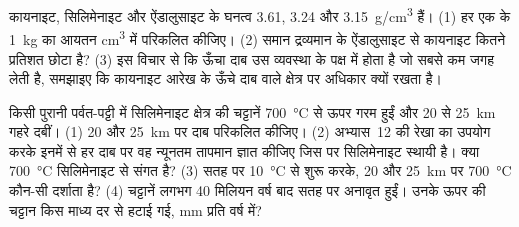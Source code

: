 \begin{exercise}[$\star\star\star$]\label{exo:g12:metamorphic-rocks:14}
कायनाइट, सिलिमेनाइट और ऐंडालुसाइट के घनत्व \num{3.61},
\num{3.24} और \qty{3.15}{g/cm^3} हैं। (1) हर एक के \qty{1}{kg} का
आयतन \unit{cm^3} में परिकलित कीजिए। (2) समान द्रव्यमान के ऐंडालुसाइट से कायनाइट
कितने प्रतिशत छोटा है? (3) इस विचार से कि ऊँचा दाब उस व्यवस्था के पक्ष में
होता है जो सबसे कम जगह लेती है, समझाइए कि कायनाइट आरेख के
ऊँचे दाब वाले क्षेत्र पर अधिकार क्यों रखता है।
\end{exercise}

\begin{exercise}[$\star\star\star$]\label{exo:g12:metamorphic-rocks:15}
किसी पुरानी पर्वत-पट्टी में सिलिमेनाइट क्षेत्र की चट्टानें
\qty{700}{\celsius} से ऊपर गरम हुईं और 20 से \qty{25}{km} गहरे दबीं। (1) 20 और
\qty{25}{km} पर दाब परिकलित कीजिए। (2) अभ्यास~12 की रेखा का उपयोग करके
इनमें से हर दाब पर वह न्यूनतम तापमान ज्ञात कीजिए जिस पर सिलिमेनाइट स्थायी है।
क्या \qty{700}{\celsius} सिलिमेनाइट से संगत है?
(3) सतह पर \qty{10}{\celsius} से शुरू करके, 20 और \qty{25}{km} पर
\qty{700}{\celsius} कौन-सी  दर्शाता है? (4) चट्टानें
लगभग 40 मिलियन वर्ष बाद सतह पर अनावृत हुईं। उनके ऊपर की चट्टान किस माध्य दर से
हटाई गई, \unit{mm} प्रति वर्ष में?
\end{exercise}


